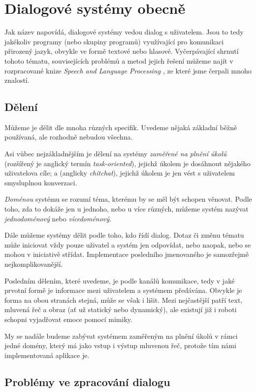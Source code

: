 
\chapter{Dialogové systémy obecně}

Jak název napovídá, dialogové systémy vedou dialog s uživatelem. Jsou to
tedy jakékoliv programy (nebo skupiny programů) využívající
pro komunikaci přirozený jazyk, obvykle ve formě textové nebo hlasové.
Vyčerpávající shrnutí tohoto tématu, souvisejících problémů a metod
jejich řešení můžeme najít v rozpracované knize
\textit{Speech and Language Processing} \citep{jurafsky_slp_2020},
ze které jsme čerpali mnoho znalostí.

\section{Dělení}
Můžeme je dělit dle mnoha různých specifik. Uvedeme nějaká
základní běžně používaná, ale rozhodně nebudou všechna.

Asi vůbec
nejzákladnějším je dělení na systémy \textit{zaměřené na plnění úkolů}
(rozšířený je anglický termín \textit{task-oriented}), jejichž úkolem
je dosáhnout nějakého uživatelova cíle; a  (anglicky
\textit{chitchat}), jejichž úkolem je jen vést s uživatelem smysluplnou
konverzaci.

\textit{Doménou} systému se rozumí téma, kterému by se měl být schopen
věnovat. Podle toho, zda to dokáže jen u jednoho, nebo u více různých,
můžeme systém nazývat \textit{jednodoménový} nebo \textit{vícedoménový}.

Dále můžeme systémy dělit podle toho, kdo řídí dialog. Dotaz či změnu tématu
může iniciovat vždy pouze uživatel a systém jen odpovídat, nebo naopak, nebo
se mohou v iniciativě střídat. Implementace posledního jmenovaného je samozřejmě
nejkomplikovanější.

Posledním dělením, které uvedeme, je podle kanálů komunikace, tedy
v jaké prvotní formě je informace mezi uživatelem a systémem předávána.
Obvykle je forma na obou stranách stejná, může se však i lišit. Mezi
nejčastější patří text, mluvená řeč a obraz (ať už statický nebo
dynamický), ale existují již i roboti schopni vyjadřovat emoce pomocí
mimiky.

My se nadále budeme zabývat systémem zaměřeným na plnění úkolů v rámci jedné
domény, který má jako vstup i výstup mluvenou řeč, protože tím námi
implementovaná aplikace je.

\section{Problémy ve zpracování dialogu}

